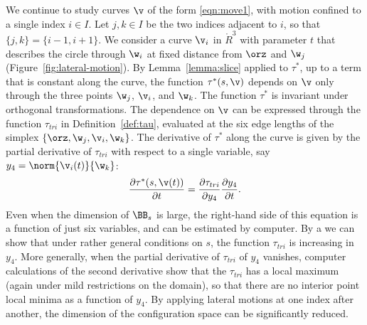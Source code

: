 %
\begin{remark}\label{rem:contract}
  We continue to study curves $\v$ of the form \eqref{eqn:move1}, with
  motion confined to a single index $i\in I$. Let $j,k\in I$ be the
  two indices adjacent to $i$, so that $\{j,k\}=\{i-1,i+1\}$.  We
  consider a curve $\v_i$ in $\ring{R}^3$ with parameter $t$ that
  describes the circle through $\w_i$ at fixed distance from $\orz$
  and $\w_j$ (Figure~\ref{fig:lateral-motion}).  By 
  Lemma~\ref{lemma:slice} applied to $\tau^*$, 
  up to a term that is constant along the
  curve, the function $\tau^*(s,\v)$ depends on $\v$ only through the
  three points $\w_j$, $\v_i$, and $\w_k$.  The function $\tau^*$ is
  invariant under orthogonal transformations.  The dependence on $\v$ can be
  expressed through the function $\tau_{tri}$ in
  Definition~\ref{def:tau}, evaluated at the six edge lengths of the
  simplex $\{ \orz,\w_j,\v_i,\w_k \}$.  The derivative of $\tau^*$
  along the curve is given by the partial derivative of $\tau_{tri}$ with
  respect to a single variable, say $y_4=\norm{\v_i(t)}{\w_k}$:
 \begin{equation}\label{eqn:tau-partial}
 \frac{\partial \tau^*(s,\v(t))}{\partial t} = \frac{\partial \tau_{tri}}{\partial y_4}
 \frac{\partial y_4}{\partial t}.
 \end{equation}  
 Even when the dimension of
  $\BB_s$ is large, the right-hand side of this equation is a function
of just six variables,
  and can be estimated by computer.  By a  we can show that
  under rather general conditions on $s$, the function $\tau_{tri}$ is
  increasing in $y_4$.  More generally, when the partial derivative
  of $\tau_{tri}$ of $y_4$ vanishes, computer calculations of the
  second derivative show that the $\tau_{tri}$ has a local maximum
  (again under mild restrictions on the domain), so that there are no
  interior point local minima as a function of $y_4$.  By applying lateral
  motions at one index after another, the dimension of the configuration space
  can be significantly reduced.
\end{remark}

\figGJBTZJI %


